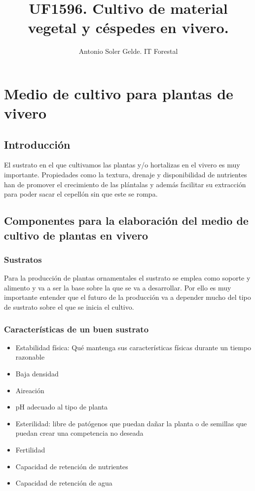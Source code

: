 \documentclass[a4paper,12pt,oneside]{article}
\author{Antonio Soler Gelde. IT Forestal}
\date{}
\title{UF1596. Cultivo de material vegetal y céspedes en vivero.}
\begin{document}
\maketitle
\thispagestyle{empty} \tableofcontents \clearpage\section{Medio de cultivo para plantas de vivero}
\label{sec:org0188757}
\subsection{Introducción}
\label{sec:org7329d76}
El sustrato en el que cultivamos las plantas y/o hortalizas en el vivero es muy
importante. Propiedades como la textura, drenaje y disponibilidad de nutrientes
han de promover el crecimiento de las plántalas y además facilitar su extracción
para poder sacar el cepellón sin que este se rompa.
\subsection{Componentes para la elaboración del medio de cultivo de plantas en vivero}
\label{sec:org9c6dde7}
\subsubsection{Sustratos}
\label{sec:orge78b69f}
Para la producción de plantas ornamentales el sustrato se emplea como soporte y
alimento y va a ser la base sobre la que se va a desarrollar. Por ello es muy
importante entender que el futuro de la producción va a depender mucho del tipo
de sustrato sobre el que se inicia el cultivo. 
\subsubsection{Características de un buen sustrato}
\label{sec:org430af06}
\begin{itemize}
\item Estabilidad física: Qué mantenga sus características físicas durante un
tiempo razonable
\item Baja densidad
\item Aireación
\item pH adecuado al tipo de planta
\item Esterilidad: libre de patógenos que puedan dañar la planta o de semillas que
puedan crear una competencia no deseada
\item Fertilidad
\item Capacidad de retención de nutrientes
\item Capacidad de retención de agua
\end{itemize}
\end{document}
